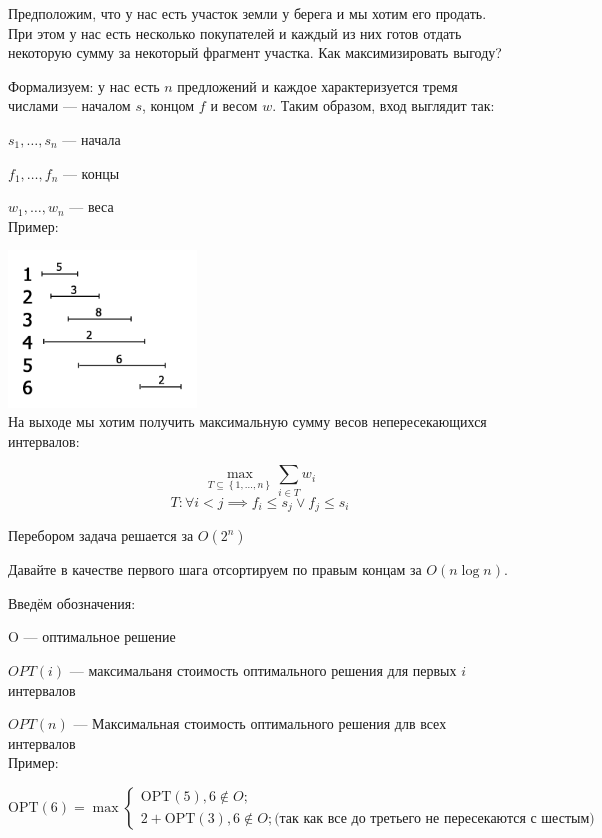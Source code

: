 \documentclass[a4paper,12pt]{article}
\begin{document}
Предположим, что у нас есть участок земли у берега и мы хотим его продать.
При этом у нас есть несколько покупателей и каждый из них готов отдать некоторую сумму за некоторый фрагмент участка.
Как максимизировать выгоду?

Формализуем: у нас есть $n$ предложений и каждое характеризуется тремя числами — началом $s$, концом $f$ и весом $w$.
Таким образом, вход выглядит так:

$s_1, \ldots, s_n$ --- начала

$f_1, \ldots, f_n$ --- концы

$w_1, \ldots, w_n$ --- веса\\

Пример:

\includegraphics[width=5cm]{09_intervals.png}\\

На выходе мы хотим получить максимальную сумму весов непересекающихся интервалов:

\[
\max\limits_{T\subseteq \left\{ 1,\ldots, n \right\}} \sum\limits_{i\in T}w_i 
\]
\[
T: \forall i<j \implies f_i \leqslant s_j \lor f_j \leqslant s_i
\]

Перебором задача решается за $O(2^n)$

Давайте в качестве первого шага отсортируем по правым концам за $O(n\log n)$.

Введём обозначения:

O --- оптимальное решение

$OPT(i)$ — максимальаня стоимость оптимального решения для первых $i$ интервалов

$OPT(n)$ — Максимальная стоимость оптимального решения длв всех интервалов\\

Пример:

\[
    \mathrm{OPT}(6) = \max\begin{cases}
        \mathrm{OPT}(5), 6\not\in O;\\
        2+ \mathrm{OPT}(3), 6\not\in O; \text{(так как все до третьего не пересекаются с шестым)}
    \end{cases}
\]
\end{document}
